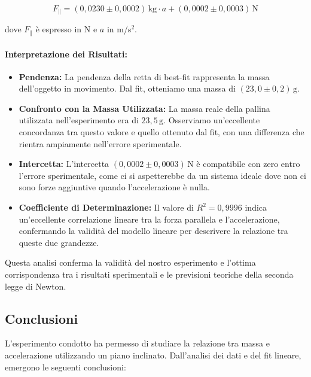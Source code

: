 \[ F_\parallel = (0,0230 \pm 0,0002) \, \text{kg} \cdot a + (0,0002 \pm 0,0003) \, \text{N} \]

dove $F_\parallel$ è espresso in N e $a$ in m/s$^2$.

\paragraph{Interpretazione dei Risultati:}

\begin{itemize}
    \item \textbf{Pendenza:} La pendenza della retta di best-fit rappresenta la massa dell'oggetto in movimento. Dal fit, otteniamo una massa di $(23,0 \pm 0,2) \, \text{g}$.
    
    \item \textbf{Confronto con la Massa Utilizzata:} La massa reale della pallina utilizzata nell'esperimento era di $23,5 \, \text{g}$. Osserviamo un'eccellente concordanza tra questo valore e quello ottenuto dal fit, con una differenza che rientra ampiamente nell'errore sperimentale.
    
    \item \textbf{Intercetta:} L'intercetta $(0,0002 \pm 0,0003) \, \text{N}$ è compatibile con zero entro l'errore sperimentale, come ci si aspetterebbe da un sistema ideale dove non ci sono forze aggiuntive quando l'accelerazione è nulla.
    
    \item \textbf{Coefficiente di Determinazione:} Il valore di $R^2 = 0,9996$ indica un'eccellente correlazione lineare tra la forza parallela e l'accelerazione, confermando la validità del modello lineare per descrivere la relazione tra queste due grandezze.
\end{itemize}

Questa analisi conferma la validità del nostro esperimento e l'ottima corrispondenza tra i risultati sperimentali e le previsioni teoriche della seconda legge di Newton.

\subsection{Conclusioni}

L'esperimento condotto ha permesso di studiare la relazione tra massa e accelerazione utilizzando un piano inclinato. Dall'analisi dei dati e del fit lineare, emergono le seguenti conclusioni:

